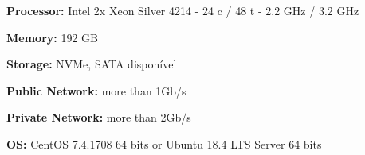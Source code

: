 \textbf{Processor:} Intel 2x Xeon Silver 4214 - 24 c / 48 t - 2.2 GHz / 3.2 GHz

\textbf{Memory:} 192 GB

\textbf{Storage:} NVMe, SATA disponível

\textbf{Public Network:} more than 1Gb/s

\textbf{Private Network:} more than 2Gb/s

\textbf{OS:} CentOS 7.4.1708 64 bits or Ubuntu 18.4 LTS Server 64 bits



% 
% 
% 
% 



